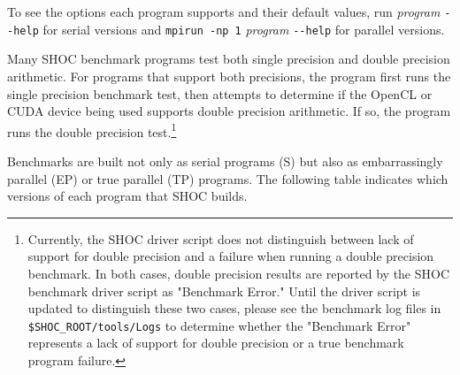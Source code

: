 \documentclass[11pt]{article}
\begin{document}
To see the options each program supports and their default values, run 
{\it program} \verb+--help+ for serial versions and \verb+mpirun -np 1+ {\it program} \verb+--help+
for parallel versions.

Many SHOC benchmark programs test both single precision and double precision
arithmetic.
For programs that support both precisions, the program first runs the
single precision benchmark test, then attempts to determine if the 
OpenCL or CUDA device being used supports double precision arithmetic.
If so, the program runs the double precision test.\footnote{ Currently,
the SHOC driver script does not distinguish between lack of support for 
double precision and a failure when running a double precision benchmark.
In both cases, double precision results are reported by the SHOC
benchmark driver script as "Benchmark Error."  
Until the driver script is updated to distinguish these two cases, please see
the benchmark log files in {\tt \$SHOC\_ROOT/tools/Logs} to determine whether
the "Benchmark Error" represents a lack of support for double precision 
or a true benchmark program failure.}

Benchmarks are built not only as serial programs (S) but also as 
embarrassingly parallel (EP) or true parallel (TP) programs. 
The following table indicates which versions of each program that 
SHOC builds.
\end{document}
